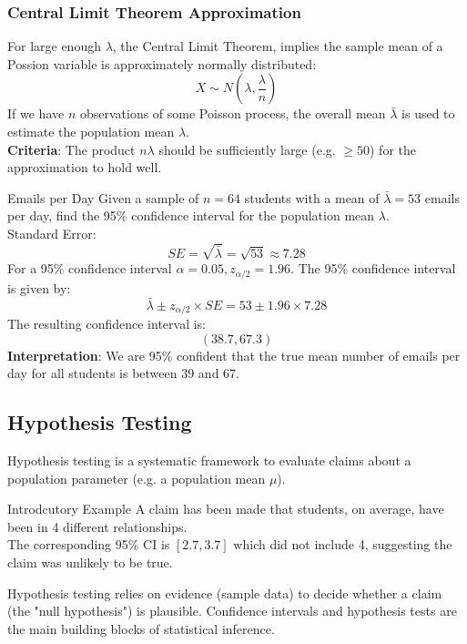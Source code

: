 \documentclass[9pt]{extarticle}
\begin{document}
\subsubsection{Central Limit Theorem Approximation}
For large enough $\lambda$, the Central Limit Theorem, implies the sample mean of a Possion variable is approximately normally distributed:
$$X \sim N(\lambda, \frac{\lambda}{n})$$
If we have $n$ observations of some Poisson process, the overall mean $\bar{\lambda}$ is used to estimate the population mean $\lambda$. \\[2ex]
\textbf{Criteria}: The product $n\lambda$ should be sufficiently large (e.g. $\geq 50$) for the approximation to hold well.
\begin{examplebox}{Emails per Day}{}
    Given a sample of $n=64$ students with a mean of $\bar{\lambda} = 53$ emails per day, find the 95\% confidence interval for the population mean $\lambda$.\\[2ex]

    Standard Error: 
    $$SE = \sqrt{\bar{\lambda}} = \sqrt{53} \approx 7.28$$
    For a 95\% confidence interval $\alpha = 0.05, z_{\alpha/2} = 1.96$.
    The 95\% confidence interval is given by:
    $$\bar{\lambda} \pm z_{\alpha/2} \times SE = 53 \pm 1.96 \times 7.28$$
    The resulting confidence interval is:
    $$(38.7, 67.3)$$
    \textbf{Interpretation}: We are 95\% confident that the true mean number of emails per day for all students is between 39 and 67.
    
\end{examplebox}

\pagebreak
\subsection{Hypothesis Testing}
Hypothesis testing is a systematic framework to evaluate claims about a population parameter (e.g. a population mean $\mu$).
\begin{examplebox}{Introdcutory Example}{}
    A claim has been made that students, on average, have been in 4 different relationships. \\
    The corresponding 95\% CI is $[2.7, 3.7]$ which did not include 4, suggesting the claim was unlikely to be true.
\end{examplebox}
Hypothesis testing relies on evidence (sample data) to decide whether a claim (the "null hypothesis") is plausible. Confidence intervals and hypothesis tests are the main building blocks of statistical inference.
\end{document}
